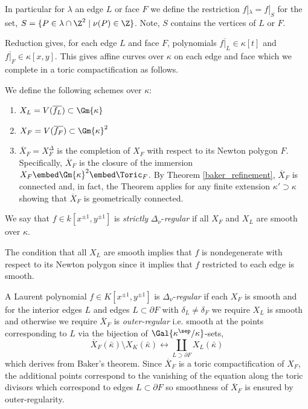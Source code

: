 \begin{defn}
In particular for $\lambda$ an edge $L$ or face $F$ we define the restriction $f |_\lambda = f|_S$ for the set, $S = \{ P \in \lambda \cap \Z^2 \mid \nu(P) \in \Z \}$. Note, $S$ contains the vertices of $L$ or $F$.  
\end{defn}

\begin{rmk}
Reduction gives, for each edge $L$ and face $F$, polynomials $\overline{f|_L} \in \kappa[t]$ and $\overline{f|_F} \in \kappa[x, y]$. This gives affine curves over $\kappa$ on each edge and face which we complete in a toric compactification as follows.
\end{rmk}

\begin{defn}[Components]
We define the following schemes over $\kappa$:
\begin{enumerate}
\item $X_L = V(\overline{f_L}) \subset \Gm{\kappa}$ 
\item $X_F = V(\overline{f_F}) \subset \Gm{\kappa}^2$
\item $\overline{X}_F = X_F^\Delta$ is the completion of $X_F$ with respect to its Newton polygon $F$. Specifically, $\overline{X}_F$ is the closure of the immersion $X_F \embed \Gm{\kappa}^2 \embed \Toric_F$. By Theorem \ref{baker_refinement}, $\overline{X}_F$ is connected and, in fact, the Theorem applies for any finite extension $\kappa' \supset \kappa$ showing that $\overline{X}_F$ is geometrically connected.
\end{enumerate}
\end{defn}

\begin{defn}
We say that $f \in k[x^{\pm 1}, y^{\pm 1}]$ is \textit{strictly} $\Delta_\nu$-\textit{regular} if all $X_F$ and $X_L$ are smooth over $\kappa$. 
\end{defn}

\begin{rmk}
The condition that all $X_L$ are smooth implies that $f$ is nondegenerate with respect to its Newton polygon since it implies that $f$ restricted to each edge is smooth. 
\end{rmk}

\begin{defn}
A Laurent polynomial $f \in K[x^{\pm 1}, y^{\pm 1}]$ is $\Delta_\nu$-\textit{regular} if each $X_F$ is smooth and for the interior edges $L$ and edges $L \subset \partial F$ with $\delta_L \neq \delta_F$ we require $X_L$ is smooth and otherwise we require $\overline{X}_F$ is \textit{outer-regular} i.e. smooth at the points corresponding to $L$ via the bijection of $\Gal{\kappa^\sep / \kappa}$-sets,
\[ \overline{X}_F(\bar{\kappa}) \setminus X_K(\bar{\kappa}) \longleftrightarrow \coprod_{L \supset \partial F} X_L(\bar{\kappa}) \]
which derives from Baker's theorem. Since $\overline{X}_F$ is a toric compactification of $X_F$, the additional points correspond to the vanishing of the equation along the toric divisors which correspond to edges $L \subset \partial F$ so smoothness of $\overline{X}_F$ is ensured by outer-regularity.
\end{defn}

